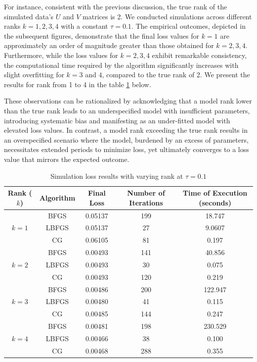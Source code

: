 \documentclass{article}
\begin{document}
For instance, consistent with the previous discussion, the true rank of the simulated data's $U$ and $V$ matrices is 2. We conducted simulations across different ranks $k = 1, 2, 3, 4$ with a constant $\tau = 0.1$. The empirical outcomes, depicted in the subsequent figures, demonstrate that the final loss values for $k = 1$ are approximately an order of magnitude greater than those obtained for $k = 2, 3, 4$. Furthermore, while the loss values for $k = 2, 3, 4$ exhibit remarkable consistency, the computational time required by the algorithm significantly increases with slight overfitting for $k = 3$ and $4$, compared to the true rank of 2. We present the results for rank from 1 to 4 in the table \ref{tab:varying_k} below.

These observations can be rationalized by acknowledging that a model rank lower than the true rank leads to an underspecified model with insufficient parameters, introducing systematic bias and manifesting as an under-fitted model with elevated loss values. In contrast, a model rank exceeding the true rank results in an overspecified scenario where the model, burdened by an excess of parameters, necessitates extended periods to minimize loss, yet ultimately converges to a loss value that mirrors the expected outcome.

\begin{table}[ht]
    \centering
    \begin{tabular}{|c|c|c|c|c|}
    \hline
    Rank ($k$) & Algorithm & Final Loss & Number of Iterations & Time of Execution (seconds) \\
    \hline
    \multirow{3}{*}{$k = 1$} & BFGS & 0.05137 & 199 & 18.747 \\
    & LBFGS & 0.05137 & 27 & 9.0607 \\
    & CG & 0.06105 & 81 & 0.197 \\
    \hline
    \multirow{3}{*}{$k = 2$} & BFGS & 0.00493 & 141 & 40.856 \\
    & LBFGS & 0.00493 & 30 & 0.075 \\
    & CG & 0.00493 & 120 & 0.219 \\
    \hline
    \multirow{3}{*}{$k = 3$} & BFGS & 0.00486 & 200 & 122.947 \\
    & LBFGS & 0.00480 & 41 & 0.115 \\
    & CG & 0.00485 & 144 & 0.247 \\
    \hline
    
    \multirow{3}{*}{$k = 4$} & BFGS & 0.00481 & 198 & 230.529 \\
    & LBFGS & 0.00466 & 38 & 0.100 \\
    & CG & 0.00468 & 288 & 0.355 \\
    \hline
    \end{tabular}
    \caption{Simulation loss results with varying rank at $\tau = 0.1$}
    \label{tab:varying_k}
\end{table}
\end{document}
